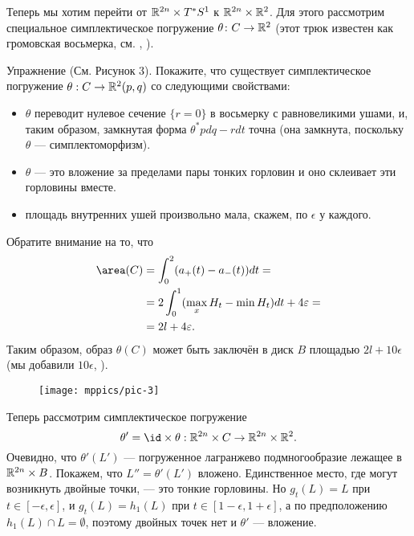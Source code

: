 Теперь мы хотим перейти от $\mathbb{R}^{2n} \times T^{\ast} S^1$ к $\mathbb{R}^{2n} \times \mathbb{R}^2$.
Для этого рассмотрим специальное симплектическое погружение $\theta\colon C \to \mathbb{R}^2$
(этот трюк известен как громовская восьмерка, см. \cite{G1}, \cite{AL}).

\begin{thm*}{Упражнение}
(См. Рисунок 3).
Покажите, что существует симплектическое погружение $\theta: C \to \mathbb{R}^2 (p, q)$ со следующими свойствами: 
\begin{itemize}
\item $\theta$ переводит нулевое сечение $\{r = 0\}$ в восьмерку с равновеликими ушами, и, таким образом, замкнутая форма $\theta^\ast pdq - rdt$ точна (она замкнута, поскольку $\theta$ --- симплектоморфизм).
\item $\theta$ --- это вложение за пределами пары тонких горловин и оно склеивает эти горловины вместе.
\item площадь внутренних ушей произвольно мала, скажем, по $\epsilon$ у каждого. 
\end{itemize}
\end{thm*}

Обратите внимание на то, что \?{}{$\area=\Area$}
\begin{align*}
\area (C) 
&= \int_0^2(a_+ (t) - a_- (t)) dt = 
\\
&=2 \int_0^1(\max_x H_t - \min H_t) dt + 4\epsilon =
\\
&=2l + 4\epsilon.
\end{align*}
Таким образом, образ $\theta (C)$ может быть заключён в диск $B$ площадью $2l + 10\epsilon$ (мы добавили $10\epsilon$, ).

\begin{figure}[ht!]
\vskip-0mm
\centering
\texttt{[image: mppics/pic-3]}
\caption{}\label{pic-3}
\vskip0mm
\end{figure}

Теперь рассмотрим симплектическое погружение 
\[\theta' = \id \times \theta: \RR^{2n} \times C \to \RR^{2n} \times \RR^2.\]
Очевидно, что $\theta' (L')$ --- погруженное лагранжево подмногообразие лежащее в $\mathbb{R}^{2n} \times B$. 
Покажем, что $L'' = \theta' (L')$ вложено.
Единственное место, где могут возникнуть двойные точки, --- это тонкие горловины.
Но $g_t (L) = L$ при $t \in [-\epsilon, \epsilon]$, 
и $g_t (L) = h_1 (L)$ при $t \in [1 - \epsilon, 1 + \epsilon]$, а по предположению $h_1 (L) \cap L = \emptyset$, поэтому двойных точек нет и $\theta'$ --- вложение.

